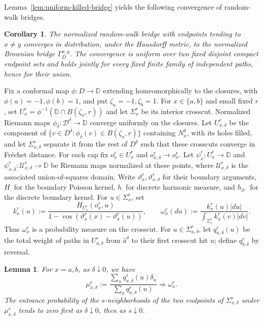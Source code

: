 \documentclass[11pt]{article}
\numberwithin{equation}{section}
\newcommand{\D}{\mathbb{D}}
\newcommand{\1}{\mathbf{1}}
\newtheorem{lemma}[theorem]{Lemma}
\newtheorem{corollary}[theorem]{Corollary}
\begin{document}
Lemma~\ref{lem:uniform-killed-bridge} yields the following convergence of random-walk bridges.
\begin{corollary}\label{lem:green-path-convergence}
The normalized random-walk bridge with endpoints tending to \(x\ne y\) converges in
distribution, under the Hausdorff metric, to the normalized Brownian bridge \(\Gamma_D^{x,y}\).
The convergence is uniform over two fixed disjoint compact endpoint sets and holds jointly for every fixed finite family of independent
paths, hence for their union.
\end{corollary}


Fix a conformal map \(\phi:D\to\D\) extending homeomorphically to the
closures, with
\(\phi(a)=-1,\phi(b)=1\), and put \(\zeta_a=-1,\zeta_b=1\).  For
\(x\in\{a,b\}\) and small fixed \(r\), set
\(U_x^r=\phi^{-1}(\D\cap B(\zeta_x,r))\) and let \(\Sigma_x^r\)
be its interior crosscut.  Normalized Riemann maps
\(\phi_\delta:\mathscr D^\delta\to\D\) converge uniformly on the
closures.  Let \(U_{x,\delta}^r\) be the component of \(\{v\in D^\delta:\phi_\delta(v)\in B(\zeta_x,r)\}\) containing \(N_x^\delta\), with
its holes filled, and let
\(\Sigma_{x,\delta}^r\) separate it from the rest
of \(D^\delta\) such that these crosscuts converge in Fr\'echet distance.  For each cap fix
\(o_x^r\in U_x^r\) and \(o_{x,\delta}^r\to o_x^r\).  Let
\(\psi_x^r:U_x^r\to\D\) and
\(\psi_{x,\delta}^r:\mathscr U_{x,\delta}^r\to\D\) be Riemann maps
normalized at these points, where \(\mathscr U_{x,\delta}^r\) is the
associated union-of-squares domain.  Write \(\vartheta_x^r,\vartheta_{x,\delta}^r\)
for their boundary arguments,
\(H_\cdot\) for the boundary Poisson kernel, \(h_\cdot\) for discrete harmonic
measure, and \(h_{\partial \cdot}\) for the discrete boundary kernel.  For
\(u\in\Sigma_x^r\), set
\[
 k_x^r(u):=
 \frac{H_{U_x^r}(o_x^r,u)}
 {1-\cos(\vartheta_x^r(x)-\vartheta_x^r(u))},\qquad
 \omega_x^r(du):=\frac{k_x^r(u)|du|}
 {\int_{\Sigma_x^r}k_x^r(v)|dv|}.
\]
Thus \(\omega_x^r\) is a probability measure on the crosscut.  For \(u\in\Sigma_{a,\delta}^r\), let
\(q_{a,\delta}^r(u)\) be the total weight of paths in \(U_{a,\delta}^r\) from
\(\widehat a^\delta\) to their first crosscut hit \(u\); define
\(q_{b,\delta}^r\) by reversal.
\begin{lemma}
\label{lem:edge-crosscut-law}
For \(x=a,b\), as \(\delta\downarrow0\), we have
\[\mu_{x,\delta}^r:=\frac{\sum_uq_{x,\delta}^r(u)\delta_u}{\sum_uq_{x,\delta}^r(u)}
 \Longrightarrow \omega_x^r.
\]
The entrance probability of the \(s\)-neighborhoods of the two endpoints of \(\Sigma_{x,\delta}^r\) under $\mu_{x,\delta}^r$
tends to zero first as \(\delta\downarrow0\), then as \(s\downarrow0\).
\end{lemma}
\end{document}
